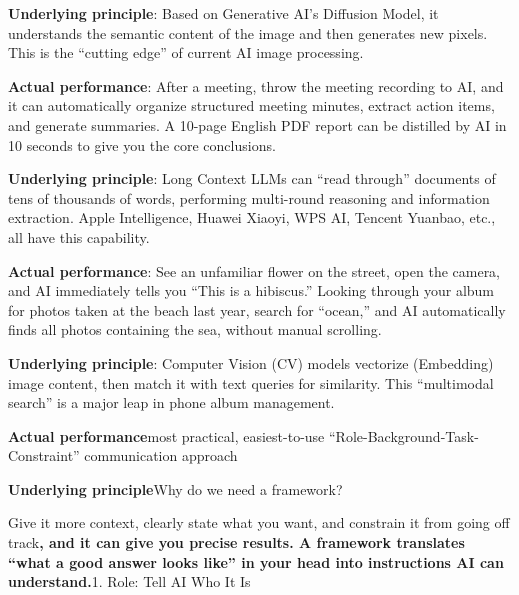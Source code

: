 \textbf{Underlying principle}: Based on Generative AI's Diffusion Model, it understands the semantic content of the image and then generates new pixels. This is the “cutting edge” of current AI image processing.


\textbf{Actual performance}: After a meeting, throw the meeting recording to AI, and it can automatically organize structured meeting minutes, extract action items, and generate summaries. A 10-page English PDF report can be distilled by AI in 10 seconds to give you the core conclusions.

\textbf{Underlying principle}: Long Context LLMs can “read through” documents of tens of thousands of words, performing multi-round reasoning and information extraction. Apple Intelligence, Huawei Xiaoyi, WPS AI, Tencent Yuanbao, etc., all have this capability.


\textbf{Actual performance}: See an unfamiliar flower on the street, open the camera, and AI immediately tells you “This is a hibiscus.” Looking through your album for photos taken at the beach last year, search for “ocean,” and AI automatically finds all photos containing the sea, without manual scrolling.

\textbf{Underlying principle}: Computer Vision (CV) models vectorize (Embedding) image content, then match it with text queries for similarity. This “multimodal search” is a major leap in phone album management.


\textbf{Actual performance}most practical, easiest-to-use “Role-Background-Task-Constraint” communication approach

\textbf{Underlying principle}Why do we need a framework?


Give it more context, clearly state what you want, and constrain it from going off track\textbf{, and it can give you precise results. A framework translates “what a good answer looks like” in your head into instructions AI can understand.}1. Role: Tell AI Who It Is

